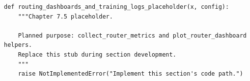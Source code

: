 \begin{lstlisting}[style=bookpython,caption={Planned code placeholder for routing dashboards and training logs.},label={lst:ch07-routing-dashboards-and-training-logs}]
def routing_dashboards_and_training_logs_placeholder(x, config):
    """Chapter 7.5 placeholder.

    Planned purpose: collect_router_metrics and plot_router_dashboard helpers.
    Replace this stub during section development.
    """
    raise NotImplementedError("Implement this section's code path.")
\end{lstlisting}
